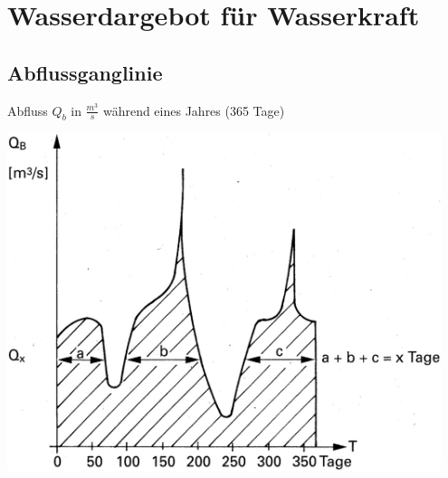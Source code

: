 \newpage
\section{Wasserdargebot für Wasserkraft}

\subsection{Abflussganglinie}
Abfluss $Q_b$ in $\frac{m^3}{s}$ während eines Jahres (365 Tage)\\
\begin{minipage}[c]{0.58\columnwidth}
    \begin{center}
        \includegraphics[width=0.95\textwidth, align=c]{images/Abflussganglinie.png}
    \end{center}
\end{minipage}

\vspace{0.25cm}




